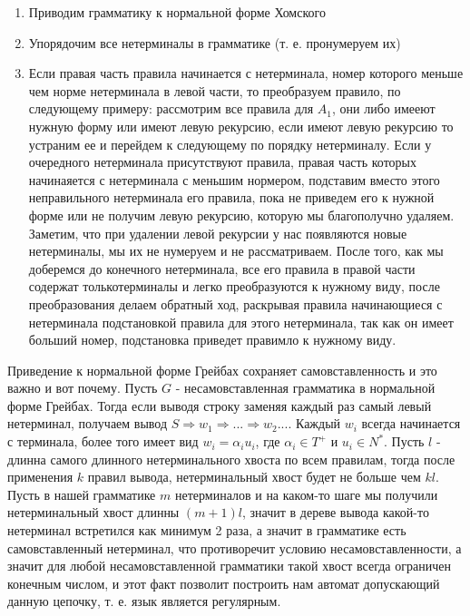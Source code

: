 \begin{enumerate}
\item Приводим грамматику к нормальной форме Хомского

\item Упорядочим все нетерминалы в грамматике (т. е. пронумеруем их)

\item Если правая часть правила начинается с нетерминала, номер которого меньше чем норме нетерминала в левой части, то преобразуем правило, по следующему примеру:
рассмотрим все правила для $A_1$, они либо имееют нужную форму или имеют левую рекурсию, если имеют левую рекурсию то устраним ее и перейдем к следующему по порядку
нетерминалу. Если у очередного нетерминала присутствуют правила, правая часть которых начинаяется с нетерминала с меньшим нормером, подставим вместо этого неправильного
нетерминала его правила, пока не приведем его к нужной форме или не получим левую рекурсию, которую мы благополучно удаляем. Заметим, что при удалении левой рекурсии
у нас появляются новые нетерминалы, мы их не нумеруем и не рассматриваем. После того, как мы доберемся до конечного нетерминала, все его правила в правой части содержат
толькотерминалы и легко преобразуются к нужному виду, после преобразования делаем обратный ход, раскрывая правила начинающиеся с нетерминала подстановкой правила
для этого нетерминала, так как он имеет больший номер, подстановка приведет правимло к нужному виду.
\end{enumerate}

Приведение к нормальной форме Грейбах сохраняет самовставленность и это важно и вот почему. Пусть $G$ - несамовставленная грамматика в нормальной форме Грейбах.
Тогда если выводя строку заменяя каждый раз самый левый нетерминал, получаем вывод $S \Rightarrow w_1 \Rightarrow ... \Rightarrow w_2 ...$. Каждый $w_i$ всегда
начинается с терминала, более того имеет вид $w_i = \alpha_i u_i$, где $\alpha_i \in T^{+}$ и $u_i \in N^{*}$. Пусть $l$ - длинна самого длинного нетерминального
хвоста по всем правилам, тогда после применения $k$ правил вывода, нетерминальный хвост будет не больше чем $kl$. Пусть в нашей грамматике $m$ нетерминалов и на
каком-то шаге мы получили нетерминальный хвост длинны $(m + 1)l$, значит в дереве вывода какой-то нетерминал встретился как минимум 2 раза, а значит в грамматике
есть самовставленный нетерминал, что противоречит условию несамовставленности, а значит для любой несамовставленной грамматики такой хвост всегда ограничен конечным
числом, и этот факт позволит построить нам автомат допускающий данную цепочку, т. е. язык является регулярным.

